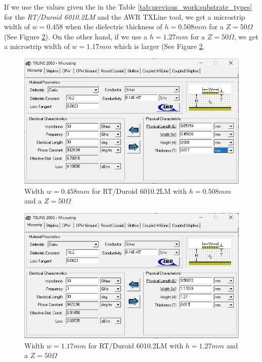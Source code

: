 \documentclass[12pt]{report} %
\begin{document}
If we use the values given the in the Table \ref{tab:previous_work:substrate_types} for the \textit{RT/Duroid 6010.2LM} and the AWR TXLine tool, we get a microstrip width of $w = 0.458 $ when the dielectric thickness of $h = 0.508 mm $ for a $Z = 50 \Omega$ (See Figure \ref{fig:previous_work:duroid_6010.2lm_h_1_27_mm_50_ohm}). On the other hand, if we use a $h = 1.27 mm$ for a $Z = 50 \Omega$, we get a microstrip width of $w = 1.17 mm$ which is larger (See Figure \ref{fig:previous_work:duroid_6010.2lm_h_1_27_mm_50_ohm}.

\begin{figure}[htbp]
    \centering
    \includegraphics[width=\textwidth]{images/previous_work/txline_tool_duroid_6010.2lm_h_0_508_mm_50_ohm.png}
    \caption{Width $w = 0.458 mm$ for RT/Duroid 6010.2LM with $h = 0.508 mm$ and a $Z = 50 \Omega$}
    \label{fig:previous_work:duroid_6010.2lm_h_0_508_mm_50_ohm}
\end{figure}

\begin{figure}[htbp]
    \centering
    \includegraphics[width=\textwidth]{images/previous_work/txline_tool_duroid_6010.2lm_h_1_27_mm_50_ohm.png}
    \caption{Width $w = 1.17 mm$ for RT/Duroid 6010.2LM with $h = 1.27 mm$ and a $Z = 50 \Omega$}
    \label{fig:previous_work:duroid_6010.2lm_h_1_27_mm_50_ohm}
\end{figure}
\end{document}

